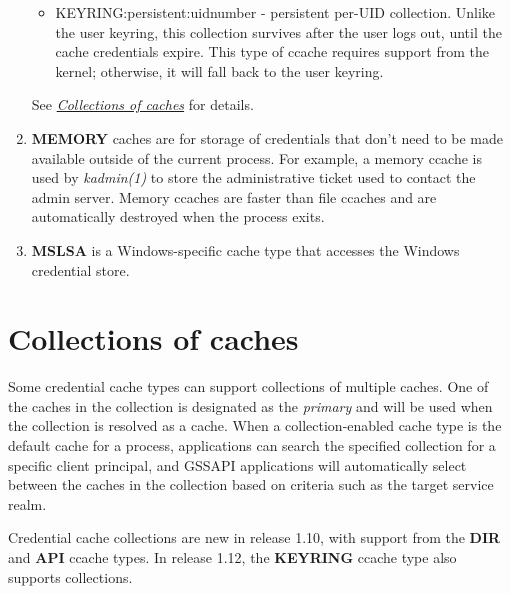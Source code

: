 \documentclass[letterpaper,10pt,english]{sphinxmanual}
\begin{document}
\begin{enumerate}
\begin{itemize}
\item {} 
KEYRING:persistent:uidnumber - persistent per-UID collection.
Unlike the user keyring, this collection survives after the user
logs out, until the cache credentials expire.  This type of
ccache requires support from the kernel; otherwise, it will fall
back to the user keyring.

\end{itemize}

See {\hyperref[basic/ccache_def:col-ccache]{\emph{Collections of caches}}} for details.

\item {} 
\textbf{MEMORY} caches are for storage of credentials that don't need to
be made available outside of the current process.  For example, a
memory ccache is used by \emph{kadmin(1)} to store the
administrative ticket used to contact the admin server.  Memory
ccaches are faster than file ccaches and are automatically
destroyed when the process exits.

\item {} 
\textbf{MSLSA} is a Windows-specific cache type that accesses the
Windows credential store.

\end{enumerate}


\section{Collections of caches}
\label{basic/ccache_def:collections-of-caches}\label{basic/ccache_def:col-ccache}
Some credential cache types can support collections of multiple
caches.  One of the caches in the collection is designated as the
\emph{primary} and will be used when the collection is resolved as a cache.
When a collection-enabled cache type is the default cache for a
process, applications can search the specified collection for a
specific client principal, and GSSAPI applications will automatically
select between the caches in the collection based on criteria such as
the target service realm.

Credential cache collections are new in release 1.10, with support
from the \textbf{DIR} and \textbf{API} ccache types.  In release 1.12, the
\textbf{KEYRING} ccache type also supports collections.
\end{document}
